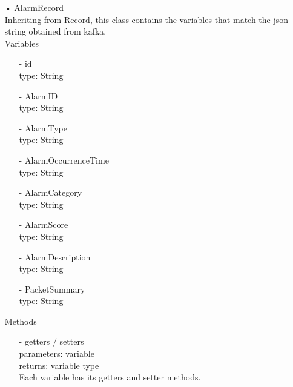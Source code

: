 \documentclass[oneside, english, final]{design}
\begin{document}
\begin{itemize}
	\item[•]AlarmRecord
	      \\Inheriting from Record, this class contains the variables that match the json string obtained from kafka.
	      \\Variables
	      \begin{itemize}
		      \item[-] id
		            \\type: String
		      \item[-] AlarmID
		            \\type: String
		      \item[-] AlarmType
		            \\type: String
		      \item[-] AlarmOccurrenceTime
		            \\type: String
		      \item[-] AlarmCategory
		            \\type: String
		      \item[-] AlarmScore
		            \\type: String
		      \item[-] AlarmDescription
		            \\type: String
		      \item[-] PacketSummary
		            \\type: String

	      \end{itemize}
	      Methods
	      \begin{itemize}
		      \item[-]getters / setters
		            \\parameters: variable
		            \\returns: variable type
		            \\Each variable has its getters and setter methods.
	      \end{itemize}


\end{itemize}
\end{document}
